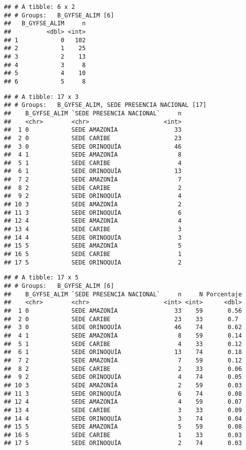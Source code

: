 \documentclass[]{article}
\theoremstyle{definition}
\theoremstyle{definition}
\theoremstyle{definition}
\theoremstyle{remark}
\begin{document}
\begin{verbatim}
## # A tibble: 6 x 2
## # Groups:   B_GYFSE_ALIM [6]
##   B_GYFSE_ALIM     n
##          <dbl> <int>
## 1            0   102
## 2            1    25
## 3            2    13
## 4            3     8
## 5            4    10
## 6            5     8
\end{verbatim}

\begin{verbatim}
## # A tibble: 17 x 3
## # Groups:   B_GYFSE_ALIM, SEDE PRESENCIA NACIONAL [17]
##    B_GYFSE_ALIM `SEDE PRESENCIA NACIONAL`     n
##    <chr>        <chr>                     <int>
##  1 0            SEDE AMAZONÍA                33
##  2 0            SEDE CARIBE                  23
##  3 0            SEDE ORINOQUÍA               46
##  4 1            SEDE AMAZONÍA                 8
##  5 1            SEDE CARIBE                   4
##  6 1            SEDE ORINOQUÍA               13
##  7 2            SEDE AMAZONÍA                 7
##  8 2            SEDE CARIBE                   2
##  9 2            SEDE ORINOQUÍA                4
## 10 3            SEDE AMAZONÍA                 2
## 11 3            SEDE ORINOQUÍA                6
## 12 4            SEDE AMAZONÍA                 4
## 13 4            SEDE CARIBE                   3
## 14 4            SEDE ORINOQUÍA                3
## 15 5            SEDE AMAZONÍA                 5
## 16 5            SEDE CARIBE                   1
## 17 5            SEDE ORINOQUÍA                2
\end{verbatim}

\begin{verbatim}
## # A tibble: 17 x 5
## # Groups:   B_GYFSE_ALIM [6]
##    B_GYFSE_ALIM `SEDE PRESENCIA NACIONAL`     n     N Porcentaje
##    <chr>        <chr>                     <int> <int>      <dbl>
##  1 0            SEDE AMAZONÍA                33    59       0.56
##  2 0            SEDE CARIBE                  23    33       0.7 
##  3 0            SEDE ORINOQUÍA               46    74       0.62
##  4 1            SEDE AMAZONÍA                 8    59       0.14
##  5 1            SEDE CARIBE                   4    33       0.12
##  6 1            SEDE ORINOQUÍA               13    74       0.18
##  7 2            SEDE AMAZONÍA                 7    59       0.12
##  8 2            SEDE CARIBE                   2    33       0.06
##  9 2            SEDE ORINOQUÍA                4    74       0.05
## 10 3            SEDE AMAZONÍA                 2    59       0.03
## 11 3            SEDE ORINOQUÍA                6    74       0.08
## 12 4            SEDE AMAZONÍA                 4    59       0.07
## 13 4            SEDE CARIBE                   3    33       0.09
## 14 4            SEDE ORINOQUÍA                3    74       0.04
## 15 5            SEDE AMAZONÍA                 5    59       0.08
## 16 5            SEDE CARIBE                   1    33       0.03
## 17 5            SEDE ORINOQUÍA                2    74       0.03
\end{verbatim}
\end{document}
